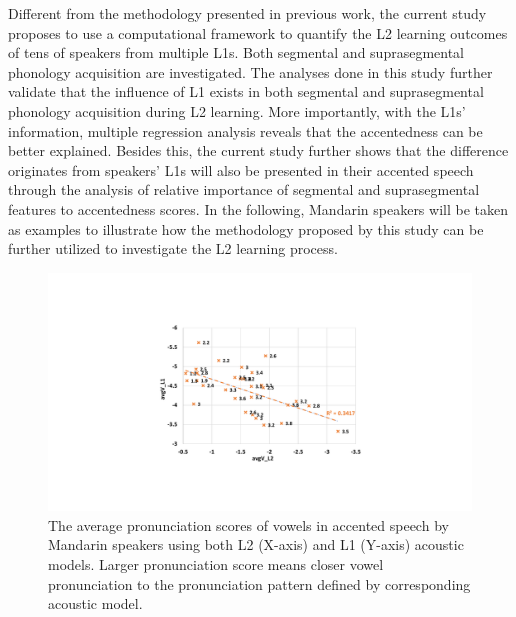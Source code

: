 Different from the methodology presented in previous work, the current study proposes to use a computational framework to quantify the L2 learning outcomes of tens of speakers from multiple L1s. Both segmental and suprasegmental phonology acquisition are investigated. The analyses done in this study further validate that the influence of L1 exists in both segmental and suprasegmental phonology acquisition during L2 learning. More importantly, with the L1s' information, multiple regression analysis reveals that the accentedness can be better explained. Besides this, the current study further shows that the difference originates from speakers' L1s will also be presented in their accented speech through the analysis of relative importance of segmental and suprasegmental features to accentedness scores. In the following, Mandarin speakers will be taken as examples to illustrate how the methodology proposed by this study can be further utilized to investigate the L2 learning process.

\begin{figure}[t]
        \begin{minipage}[t]{1.0\linewidth}
        \centering
            \includegraphics[width=5.0in]{figures/ch7_seg.pdf}
        \end{minipage}%
        \caption{The average pronunciation scores of vowels in accented speech by Mandarin speakers using both L2 (X-axis) and L1 (Y-axis) acoustic models. Larger pronunciation score means closer vowel pronunciation to the pronunciation pattern defined by corresponding acoustic model.}
        \centering
        \label{fig:ch7_seg}
     \end{figure}

